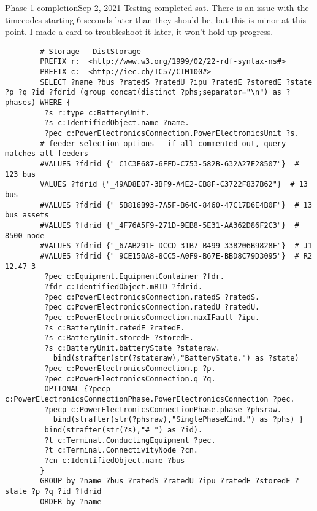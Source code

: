 \begin{entry}{Phase 1 completion}{Sep 2, 2021}
    Testing completed sat. There is an issue with the timecodes starting 6 seconds later than they should be,
    but this is minor at this point. I made a card to troubleshoot it later, it won't hold up progress.


    \data
    
    \begin{verbatim}
        # Storage - DistStorage
        PREFIX r:  <http://www.w3.org/1999/02/22-rdf-syntax-ns#>
        PREFIX c:  <http://iec.ch/TC57/CIM100#>
        SELECT ?name ?bus ?ratedS ?ratedU ?ipu ?ratedE ?storedE ?state ?p ?q ?id ?fdrid (group_concat(distinct ?phs;separator="\n") as ?phases) WHERE {
         ?s r:type c:BatteryUnit.
         ?s c:IdentifiedObject.name ?name.
         ?pec c:PowerElectronicsConnection.PowerElectronicsUnit ?s.
        # feeder selection options - if all commented out, query matches all feeders
        #VALUES ?fdrid {"_C1C3E687-6FFD-C753-582B-632A27E28507"}  # 123 bus
        VALUES ?fdrid {"_49AD8E07-3BF9-A4E2-CB8F-C3722F837B62"}  # 13 bus
        #VALUES ?fdrid {"_5B816B93-7A5F-B64C-8460-47C17D6E4B0F"}  # 13 bus assets
        #VALUES ?fdrid {"_4F76A5F9-271D-9EB8-5E31-AA362D86F2C3"}  # 8500 node
        #VALUES ?fdrid {"_67AB291F-DCCD-31B7-B499-338206B9828F"}  # J1
        #VALUES ?fdrid {"_9CE150A8-8CC5-A0F9-B67E-BBD8C79D3095"}  # R2 12.47 3
         ?pec c:Equipment.EquipmentContainer ?fdr.
         ?fdr c:IdentifiedObject.mRID ?fdrid.
         ?pec c:PowerElectronicsConnection.ratedS ?ratedS.
         ?pec c:PowerElectronicsConnection.ratedU ?ratedU.
         ?pec c:PowerElectronicsConnection.maxIFault ?ipu.
         ?s c:BatteryUnit.ratedE ?ratedE.
         ?s c:BatteryUnit.storedE ?storedE.
         ?s c:BatteryUnit.batteryState ?stateraw.
           bind(strafter(str(?stateraw),"BatteryState.") as ?state)
         ?pec c:PowerElectronicsConnection.p ?p.
         ?pec c:PowerElectronicsConnection.q ?q.
         OPTIONAL {?pecp c:PowerElectronicsConnectionPhase.PowerElectronicsConnection ?pec.
         ?pecp c:PowerElectronicsConnectionPhase.phase ?phsraw.
           bind(strafter(str(?phsraw),"SinglePhaseKind.") as ?phs) }
         bind(strafter(str(?s),"#_") as ?id).
         ?t c:Terminal.ConductingEquipment ?pec.
         ?t c:Terminal.ConnectivityNode ?cn.
         ?cn c:IdentifiedObject.name ?bus
        }
        GROUP by ?name ?bus ?ratedS ?ratedU ?ipu ?ratedE ?storedE ?state ?p ?q ?id ?fdrid
        ORDER by ?name
    \end{verbatim}

    \results
    


\end{entry}


